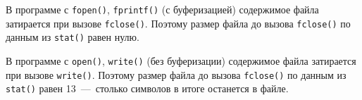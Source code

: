 В программе с \texttt{fopen()}, \texttt{fprintf()} (с буферизацией) содержимое файла затирается при вызове \texttt{fclose()}. Поэтому размер файла до вызова \texttt{fclose()} по данным из \texttt{stat()} равен нулю.

В программе с \texttt{open()}, \texttt{write()} (без буферизации) содержимое файла затирается при вызове \texttt{write()}. Поэтому размер файла до вызова \texttt{fclose()} по данным из \texttt{stat()} равен 13~---~столько символов в итоге останется в файле.





